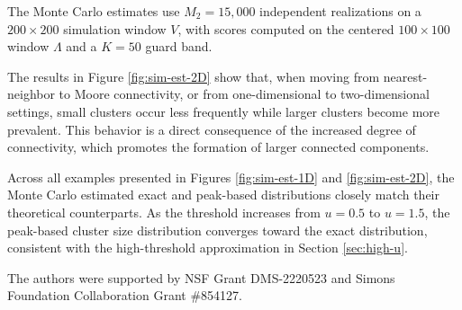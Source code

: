 \documentclass[aap,preprint]{imsart}
\theoremstyle{plain}
\theoremstyle{definition}
\begin{document}
	The Monte Carlo estimates use $M_2=15{,}000$ independent realizations on a
	$200\times200$ simulation window $V$, with scores computed on the centered
	$100\times100$ window $\Lambda$ and a $K=50$ guard band.
	
	 The results in Figure \ref{fig:sim-est-2D} show that, when moving from nearest-neighbor to Moore connectivity, or from one-dimensional to two-dimensional settings, small clusters occur less frequently while larger clusters become more prevalent. This behavior is a direct consequence of the increased degree of connectivity, which promotes the formation of larger connected components. 
	
	Across all examples presented in Figures \ref{fig:sim-est-1D} and \ref{fig:sim-est-2D}, the Monte Carlo estimated exact and peak-based distributions closely match their theoretical counterparts. As the threshold increases from $u=0.5$ to $u=1.5$, the peak-based cluster size distribution converges toward the exact distribution, consistent with the high-threshold approximation in Section \ref{sec:high-u}.
	
	
	
	
	\begin{funding}
		The authors were supported by NSF Grant DMS-2220523 and Simons Foundation Collaboration Grant \#854127. 
	\end{funding}
	
	
	
	
	
\end{document}
